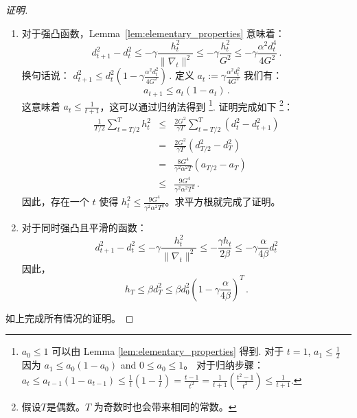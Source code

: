 \begin{proof}[证明]
\begin{enumerate}
\item
对于强凸函数，Lemma~\ref{lem:elementary_properties} 意味着：
\[ d_{t+1}^2 - d_t^2
  \leq - \gamma \frac{h_t^2}{\|\nabla_t\|^2}
  \leq - \gamma \frac{h_t^2}{G^2}
  \leq  - \gamma  \frac{\alpha^2 d_t^4 }{4 G^2} \, .
\]
换句话说：
$d_{t+1}^2  \leq  d_t^2 ( 1- \gamma \frac{\alpha^2 d_t^2}{4 G^2} ) \, .$ 
定义  $a_t :={\gamma}\frac{\alpha^2 d_t^2}{4 G^2}$ 我们有：
\[
a_{t+1}  \leq  a_t (1-a_t) \, .
\]
这意味着 $a_t\leq\frac{1}{t+1}$，这可以通过归纳法得到
\footnote{
$a_0\leq 1$ 可以由  Lemma \ref{lem:elementary_properties} 得到. 对于 $t=1$, $a_1\leq \frac{1}{2}$ 因为  $a_1  \leq  a_0 (1-a_0)$ and $0\leq a_0\leq 1$。
对于归纳步骤：
  $ a_t  \leq  a_{t-1} (1-a_{t-1}) \leq
  \frac{1}{t}(1-\frac{1}{t})
  =\frac{t-1}{t^2}=\frac{1}{t+1}(\frac{t^2-1}{t^2})
  \leq \frac{1}{t+1}$.}. 
证明完成如下 \footnote{假设$T$是偶数。$T$ 为奇数时也会带来相同的常数。}：
\begin{eqnarray*}
\frac{1}{ T/2 } \sum_{t= T/2 }^T h_t^2 &
\leq& \frac{2G^2}{\gamma  T  }\sum_{t= T/2 }^T ( d_t^2 -
                                   d_{t+1}^2)  \\
  &=&\frac{2 G^2}{\gamma  T } ( d _{ T/2 }^2 - d_T^2)  \\
  &=&\frac{8 G^4}{ \gamma^2 \alpha^2   T} ( a
    _{ T/2 } - a_T)  \\ 
   & \leq &\frac{9 G^4}{\gamma^2 \alpha^2 T ^2} 
  \, .
\end{eqnarray*}
因此，存在一个  $t$ 使得  $h_t^2 \leq \frac{ 9 G^4}{\gamma^2 \alpha^2 T^2} $。求平方根就完成了证明。

\item
对于同时强凸且平滑的函数：
\[ d_{t+1}^2 - d_t^2 \leq - \gamma \frac{h_t^2}{\|\nabla_t\|^2} \leq
 - \frac{\gamma h_t}{2 \beta} \leq
  - \gamma \frac{\alpha}{4\beta} d_t^2
  \]
  因此，
  \[
    h_{T} \leq \beta d_{T}^2 \leq \beta d_0^2
    \left(1-\gamma\frac{\alpha}{4 \beta}\right)^T\, .
    \]
  \end{enumerate}
如上完成所有情况的证明。
\end{proof}












